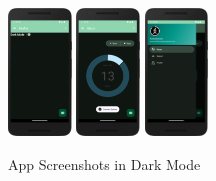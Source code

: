     \begin{figure}[H]
        \centering
        \includegraphics[width=0.15\textwidth]{res/img/darkMode1.png}
        \hspace{0.05\textwidth}
        \includegraphics[width=0.15\textwidth]{res/img/darkMode2.png}      
        \hspace{0.05\textwidth}
        \includegraphics[width=0.15\textwidth]{res/img/darkMode3.png}
        \caption{App Screenshots in Dark Mode}
        \label{fig:ex2_2.4}
    \end{figure}